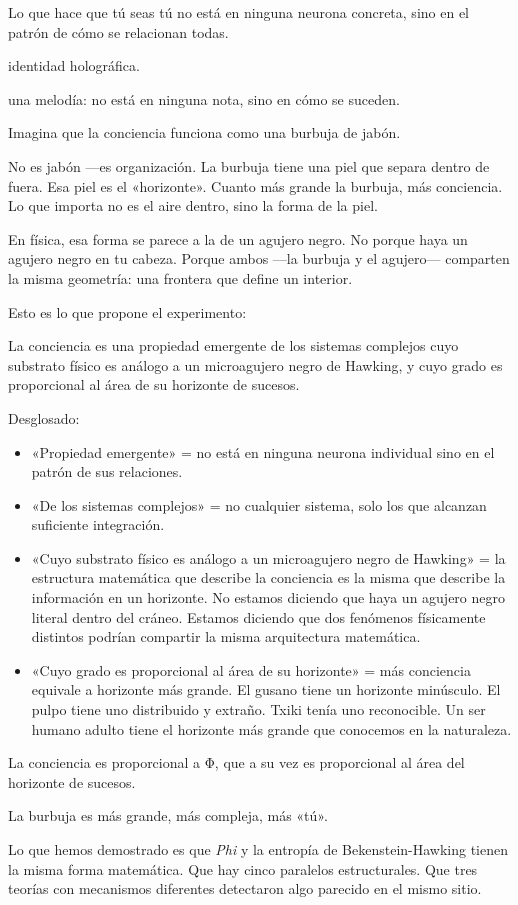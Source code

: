 Lo que hace que tú seas tú no está en ninguna neurona concreta, sino en el patrón de cómo se relacionan todas.

\begin{fisica}
 identidad holográfica.

 una melodía: no está en ninguna nota, sino en cómo se suceden.
\end{fisica}
\noindent Imagina que la conciencia funciona como una burbuja de jabón.

No es jabón —es organización. La burbuja tiene una piel que separa dentro de fuera. Esa piel es el «horizonte». Cuanto más grande la burbuja, más conciencia. Lo que importa no es el aire dentro, sino la forma de la piel.

En física, esa forma se parece a la de un agujero negro. No porque haya un agujero negro en tu cabeza. Porque ambos —la burbuja y el agujero— comparten la misma geometría: una frontera que define un interior.

Esto es lo que propone el experimento:

\begin{tesis}
La conciencia es una propiedad emergente de los sistemas complejos cuyo substrato físico es análogo a un microagujero negro de Hawking, y cuyo grado es proporcional al área de su horizonte de sucesos.
\end{tesis}
Desglosado:
\begin{itemize}
\item «Propiedad emergente» = no está en ninguna neurona individual sino en el patrón de sus relaciones.
\item «De los sistemas complejos» = no cualquier sistema, solo los que alcanzan suficiente integración.
\item «Cuyo substrato físico es análogo a un microagujero negro de Hawking» = la estructura matemática que describe la conciencia es la misma que describe la información en un horizonte. No estamos diciendo que haya un agujero negro literal dentro del cráneo. Estamos diciendo que dos fenómenos físicamente distintos podrían compartir la misma arquitectura matemática.
\item «Cuyo grado es proporcional al área de su horizonte» = más conciencia equivale a horizonte más grande. El gusano tiene un horizonte minúsculo. El pulpo tiene uno distribuido y extraño. Txiki tenía uno reconocible. Un ser humano adulto tiene el horizonte más grande que conocemos en la naturaleza.
\end{itemize}
\begin{fisica}
 La conciencia es proporcional a Φ, que a su vez es proporcional al área del horizonte de sucesos.

 La burbuja es más grande, más compleja, más «tú».
\end{fisica}
\noindent Lo que hemos demostrado es que \emph{Phi} y la entropía de Bekenstein-Hawking tienen la misma forma matemática. Que hay cinco paralelos estructurales. Que tres teorías con mecanismos diferentes detectaron algo parecido en el mismo sitio.

